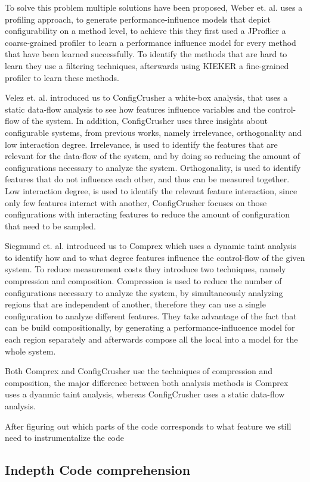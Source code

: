 To solve this problem multiple solutions have been proposed, Weber et. al. \cite{White-box-Profiling} uses a profiling approach, to generate 
performance-influence models that depict configurability on a method level, to achieve this they first used a JProflier a coarse-grained profiler
to learn a performance influence model for every method that have been learned successfully. 
To identify the methods that are hard to learn they use a filtering techniques, afterwards using KIEKER a fine-grained profiler to learn these methods.

Velez et. al. introduced us to ConfigCrusher \cite{ConfigCrusher} a white-box analysis, that uses a static data-flow analysis to see how features influence 
variables and the control-flow of the system. In addition, ConfigCrusher uses three insights about configurable systems, from previous works, namely
irrelevance, orthogonality and low interaction degree. Irrelevance, is used to identify the features that are relevant for the data-flow of the system, and by
doing so reducing the amount of configurations necessary to analyze the system. Orthogonality, is used to identify features that do not influence each other, and
thus can be measured together. Low interaction degree, is used to identify the relevant feature interaction, since only few features interact with another, 
ConfigCrusher focuses on those configurations with interacting features to reduce the amount of configuration that need to be sampled.

Siegmund et. al. introduced us to Comprex \cite{Comprex} which uses a dynamic taint analysis to identify how
and to what degree features influence the control-flow of the given system. 
To reduce measurement costs they introduce two techniques, namely compression and composition. 
Compression is used to reduce the number of configurations necessary to analyze the system,
by simultaneously analyzing regions that are independent of another, therefore they can use a single configuration to 
analyze different features. 
They take advantage of the fact that \perfInfluenceModel can be build compositionally, by generating a performance-influcence model for each region separately
and afterwards compose all the local \perfInfluenceModel into a model for the whole system.

Both Comprex and ConfigCrusher use the techniques of compression and composition, the major difference between both analysis methods is Comprex uses a dyanmic taint
analysis, whereas ConfigCrusher uses a static data-flow analysis. 


After figuring out which parts of the code corresponds to what feature we still need to instrumentalize the code 

\subsection{Indepth Code comprehension} %